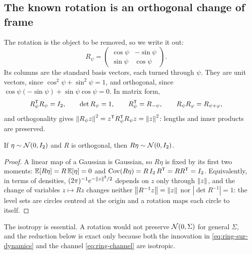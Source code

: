 \subsection{The known rotation is an orthogonal change of frame}

The rotation is the object to be removed, so we write it out:
\begin{equation}
  R_\psi =
  \begin{pmatrix} \cos\psi & -\sin\psi \\ \sin\psi & \cos\psi \end{pmatrix} .
  \label{eq:ring-rotation}
\end{equation}
Its columns are the standard basis vectors, each turned through $\psi$. They
are unit vectors, since $\cos^2\psi + \sin^2\psi = 1$, and orthogonal, since
$\cos\psi(-\sin\psi) + \sin\psi\cos\psi = 0$. In matrix form,
\begin{equation}
  R_\psi^{\mathsf{T}} R_\psi = I_2, \qquad \det R_\psi = 1, \qquad
  R_\psi^{\mathsf{T}} = R_{-\psi}, \qquad R_\psi R_\varphi = R_{\psi+\varphi} ,
  \label{eq:ring-rot-props}
\end{equation}
and orthogonality gives
$\left\lVert R_\psi z \right\rVert^2 = z^{\mathsf{T}} R_\psi^{\mathsf{T}} R_\psi z = \left\lVert z \right\rVert^2$: lengths and
inner products are preserved.

\begin{lemma}
\label{lem:ring-isotropy}
If $\eta \sim \mathcal{N}(0, I_2)$ and $R$ is orthogonal, then $R\eta \sim \mathcal{N}(0,I_2)$.
\end{lemma}

\begin{proof}
A linear map of a Gaussian is Gaussian, so $R\eta$ is fixed by its first two
moments: $\mathbb{E}[R\eta] = R\,\mathbb{E}[\eta] = 0$ and
$\mathrm{Cov}(R\eta) = R\, I_2\, R^{\mathsf{T}} = R R^{\mathsf{T}} = I_2$. Equivalently, in
terms of densities, $(2\pi)^{-1}e^{-\left\lVert z \right\rVert^2/2}$ depends on $z$ only through
$\left\lVert z \right\rVert$, and the change of variables $z \mapsto Rz$ changes neither
$\left\lVert R^{-1}z \right\rVert = \left\lVert z \right\rVert$ nor $|\det R^{-1}| = 1$: the level sets are circles
centred at the origin and a rotation maps each circle to itself.
\end{proof}

The isotropy is essential. A rotation would not preserve $\mathcal{N}(0,\Sigma)$ for
general $\Sigma$, and the reduction below is exact only because both the
innovation in \eqref{eq:ring-sur-dynamics} and the channel
\eqref{eq:ring-channel} are isotropic.

